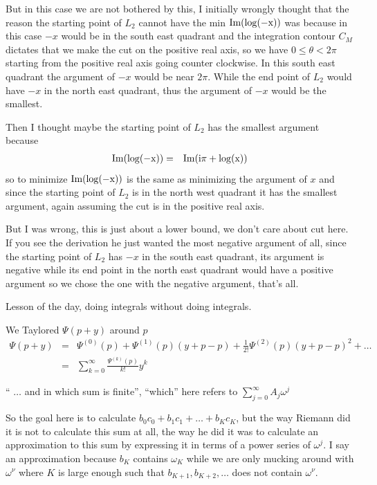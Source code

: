 \documentclass[aps,preprint,preprintnumbers,nofootinbib,showpacs,prd]{revtex4-1}
\newcommand{\nbea}{\begin{eqnarray*}}
\newcommand{\neea}{\end{eqnarray*}}
\def\Im{\rm Im}
\begin{document}
But in this case we are not bothered by this, I initially wrongly thought that the reason the starting point of $L_2$ cannot have the min $\Im(\log(-x))$ was because in this case $-x$ would be in the south east quadrant and the integration contour $C_M$ dictates that we make the cut on the positive real axis, so we have $0 \le \theta < 2\pi$ starting from the positive real axis going counter clockwise. In this south east quadrant the argument of $-x$ would be near $2\pi$. While the end point of $L_2$ would have $-x$ in the north east quadrant, thus the argument of $-x$ would be the smallest.

Then I thought maybe the starting point of $L_2$ has the smallest argument because
%
\nbea
\Im{(\log(-x))} & = & \Im{(i\pi + \log(x))}
\neea
%
so to minimize $\Im(\log(-x))$ is the same as minimizing the argument of $x$ and since the starting point of $L_2$ is in the north west quadrant it has the smallest argument, again assuming the cut is in the positive real axis.

But I was wrong, this is just about a lower bound, we don't care about cut here. If you see the derivation he just wanted the most negative argument of all, since the starting point of $L_2$ has $-x$ in the south east quadrant, its argument is negative while its end point in the north east quadrant would have a positive argument so we chose the one with the negative argument, that's all.










Lesson of the day, doing integrals without doing integrals.


We Taylored $\Psi(p+y)$ around $p$
%
\nbea
\Psi(p+y) & = & \Psi^{(0)}(p) + \Psi^{(1)}(p) (y+p - p) + \frac{1}{2!}\Psi^{(2)}(p) (y+p - p)^2 + \dots \\
& = & \sum_{k=0}^\infty \frac{\Psi^{(k)}(p)}{k!} y^k
\neea
%




`` $\dots$ and in which sum is finite'', ``which'' here refers to $\sum_{j=0}^\infty A_j \omega^j$


So the goal here is to calculate $b_0 c_0 + b_1 c_1 + \dots + b_Kc_K$, but the way Riemann did it is not to calculate this sum at all, the way he did it was to calculate an approximation to this sum by expressing it in terms of a power series of $\omega^j$. I say an approximation because $b_K$ contains $\omega_K$ while we are only mucking around with $\omega^\nu$ where $K$ is large enough such that $b_{K+1}, b_{K+2}, \dots$ does not contain $\omega^\nu$.
\end{document}
